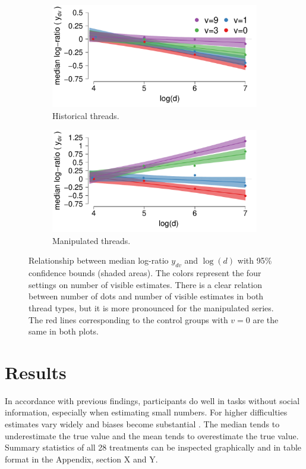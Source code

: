 \documentclass[9pt,twocolumn,twoside,lineno]{pnas-new}
\begin{document}
\begin{figure}[!h]
\centering
	\begin{subfigure}[t]{.46\linewidth}
		\centering
		\includegraphics[width=1\linewidth]{med_confidence_h.pdf}	
		\caption{\footnotesize Historical threads.}
		\label{fig: median confidence bounds - historic}
	\end{subfigure}
	\begin{subfigure}[t]{.46\linewidth}
		\centering
		\includegraphics[width=1\linewidth]{med_confidence_m.pdf}		
		\caption{\footnotesize Manipulated threads.}
		\label{fig: median confidence bounds - manipulated}
	\end{subfigure}
	\caption{Relationship between median log-ratio $y_{dv}$ and $\log(d)$ with 95\% confidence bounds (shaded areas). The colors represent the four settings on number of visible estimates. There is a clear relation between number of dots and number of visible estimates in both thread types, but it is more pronounced for the manipulated series. The red lines corresponding to the control groups with $v=0$ are the same in both plots.}
	\label{fig: median confidence bounds}
\end{figure}

\section*{Results}
In accordance with previous findings, participants do well in tasks without social information, especially when estimating small numbers. For higher difficulties estimates vary widely and biases become substantial \cite{indow1977scaling, izard2008calibrating, krueger1982single, krueger1984perceived, kao2018counteracting}. The median tends to underestimate the true value and the mean tends to overestimate the true value. Summary statistics of all 28 treatments can be inspected graphically and in table format in the Appendix, section X and Y.
\end{document}
